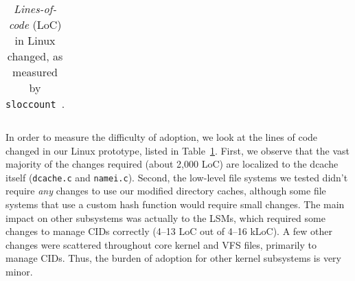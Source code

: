 \begin{table}[t]
\begin{tabular}{|p{1.3in}|r|rr|}
\hline
\end{tabular}
\caption{{\em Lines-of-code} (LoC) in Linux changed, as measured by {\tt sloccount}~\cite{sloccount}.}
\label{table:portability}
\end{table}

In order to measure the difficulty of adoption, we look at the lines of code changed
in our Linux prototype, listed in Table~\ref{table:portability}.
First, we observe that the vast majority of the changes required (about 2,000 LoC)
are localized to the dcache itself ({\tt dcache.c} and {\tt namei.c}).
Second, the low-level file systems we tested didn't require {\em any} changes to use our modified directory caches,
although some file systems that use a custom hash function  would require small changes.
The main impact on other subsystems was actually to the LSMs, which required some changes
to manage CIDs correctly (4--13 LoC out of 4--16 kLoC).
A few other changes were scattered throughout core kernel and VFS files, primarily to manage CIDs.
Thus, the burden of adoption for other kernel subsystems is very minor.



